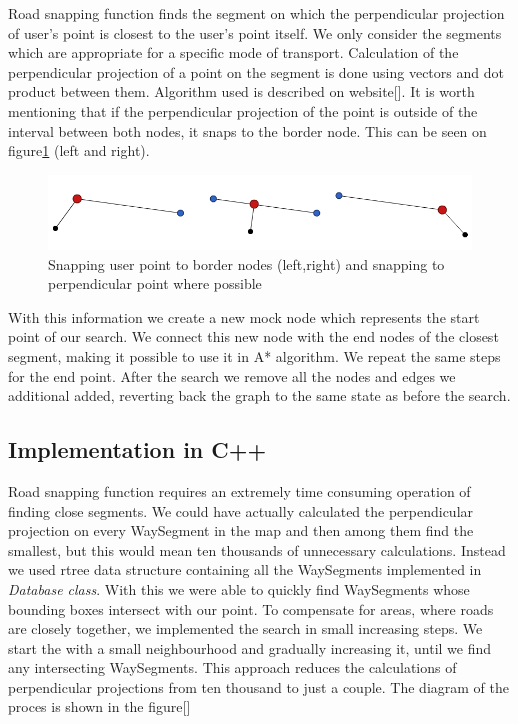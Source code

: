 \documentclass[reqno,openany,12pt]{amsbook}
\theoremstyle{definition}
\theoremstyle{remark}
\begin{document}
Road snapping function finds the segment on which the perpendicular projection of user's point is closest to the user's point itself. We only consider the segments which are appropriate for a specific mode of transport. Calculation of the perpendicular projection of a point on the segment is done using vectors and dot product between them. Algorithm used is described on website[]. It is worth mentioning that if the perpendicular projection of the point is outside of the interval between both nodes, it snaps to the border node. This can be seen on figure\ref{fig:db_snap} (left and right).

 \begin{figure}[h]
 \centering
 \includegraphics[width=0.8\linewidth]{../photos/snap_points.png}
 \caption{Snapping user point to border nodes (left,right) and snapping to perpendicular point where possible}
 \label{fig:db_snap}
 \end{figure}

 With this information we create a new mock node which represents the start point of our search. We connect this new node with the end nodes of the closest segment, making it possible to use it in A* algorithm. We repeat the same steps for the end point. After the search we remove all the nodes and edges we additional added, reverting back the graph to the same state as before the search.

  \subsection{Implementation in C++}
Road snapping function requires an extremely time consuming operation of finding close segments. We could have actually calculated the perpendicular projection on every WaySegment in the map and then among them find the smallest, but this would mean ten thousands of unnecessary calculations. Instead we used rtree data structure containing all the WaySegments implemented in \textit{Database class}. With this we were able to quickly find WaySegments whose bounding boxes intersect with our point. To compensate for areas, where roads are closely together, we implemented the search in small increasing steps. We start the with a small neighbourhood and gradually increasing it, until we find any intersecting WaySegments. This approach reduces the calculations of perpendicular projections from ten thousand to just a couple. The diagram of the proces is shown in the figure[]
\end{document}
